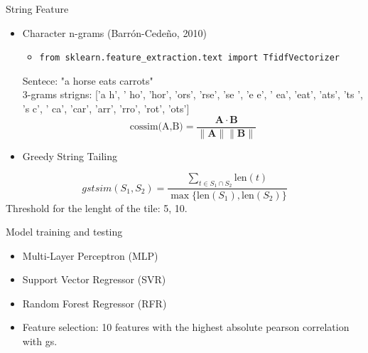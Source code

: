 \begin{frame}{String Feature}

    \begin{itemize}
        \item Character n-grams (Barrón-Cedeño, 2010)
        \vspace{0.2cm}
        \begin{itemize}
            \item \texttt{from sklearn.feature\_extraction.text import TfidfVectorizer} 
        \end{itemize}
        \vspace{0.2cm} 
        Sentece: "a horse eats carrots" \\ \vspace{0.2cm}
        3-grams strigns: ['a h', ' ho', 'hor', 'ors', 'rse', 'se ', 'e e', ' ea', 'eat', 'ats', 'ts ', 's c', ' ca', 'car', 'arr', 'rro', 'rot', 'ots']
        \[ 
            \text{cossim(A,B)} = \frac{\mathbf{A} \cdot \mathbf{B}}{\|\mathbf{A}\| \|\mathbf{B}\|}
             \]
    \end{itemize}

    \begin{itemize}
        \item Greedy String Tailing
    \end{itemize}
    \[
gstsim(S_1, S_2) = \frac{\sum_{t \in S_1 \cap S_2} \text{len}(t)}{\max \{ \text{len}(S_1), \text{len}(S_2) \}}
\]
        Threshold for the lenght of the tile: 5, 10. \\ \vspace{0.1cm}
\end{frame}

\begin{frame}{Model training and testing}
    \begin{itemize}
        \item Multi-Layer Perceptron (MLP)
        \item Support Vector Regressor (SVR)
        \item Random Forest Regressor (RFR)
    \end{itemize} 
    \vspace{1cm}
    \begin{itemize}
        \item Feature selection: 10 features with the highest absolute pearson correlation with gs.
    \end{itemize}

\end{frame}

